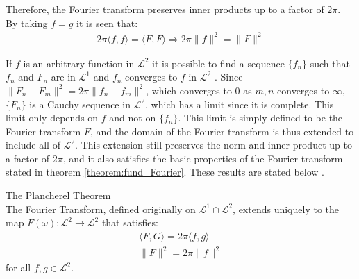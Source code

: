 Therefore, the Fourier transform preserves inner products up to a factor of $2\pi$. By taking $f = g$ it is seen that:
\begin{align*}
2\pi \langle f,f \rangle = \langle F,F \rangle \Rightarrow 2\pi \|f\|^2 = \|F\|^2
\end{align*}

If $f$ is an arbitrary function in $\mathcal{L}^2$ it is possible to find a sequence $\{f_n\}$ such that $f_n$ and $F_n$ are in $\mathcal{L}^1$ and $f_n$ converges to $f$ in $\mathcal{L}^2$ \cite{page 82, FAA}. Since $\|F_n - F_m\|^2 = 2\pi\|f_n - f_m\|^2$, which converges to 0 as $m,n$ converges to $\infty$, $\{F_n\}$ is a Cauchy sequence in $\mathcal{L}^2$, which has a limit since it is complete. This limit only depends on $f$ and not on $\{f_n\}$. This limit is simply defined to be the Fourier transform $F$, and the domain of the Fourier transform is thus extended to include all of $\mathcal{L}^2$. This extension still preserves the norm and inner product up to a factor of $2\pi$, and it also satisfies the basic properties of the Fourier transform stated in theorem \ref{theorem:fund_Fourier}. These results are stated below \cite{page 222, FAA}.

\begin{theorem}{The Plancherel Theorem} \label{Plancherel}
\\
The Fourier Transform, defined originally on $\mathcal{L}^1 \cap \mathcal{L}^2$, extends uniquely to the map $F(\omega): \mathcal{L}^2 \to \mathcal{L}^2$ that satisfies:
\begin{align*}
\langle F, G \rangle = 2\pi \langle f,g \rangle \\
\|F\|^2  = 2\pi \|f\|^2
\end{align*}
for all $f,g \in \mathcal{L}^2$.
\end{theorem}

%
%
%

